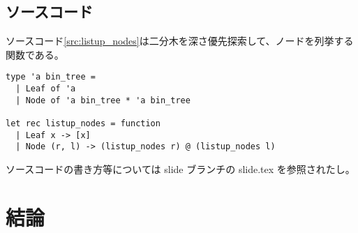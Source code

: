 \documentclass{sumiilab-paper}
\begin{document}
\section{ソースコード}

ソースコード\ref{src:listup_nodes}は二分木を深さ優先探索して、ノードを列挙する関数である。
\begin{lstlisting}[caption=二分木のノードのリストアップ,label=src:listup_nodes]
type 'a bin_tree =
  | Leaf of 'a
  | Node of 'a bin_tree * 'a bin_tree

let rec listup_nodes = function
  | Leaf x -> [x]
  | Node (r, l) -> (listup_nodes r) @ (listup_nodes l)
\end{lstlisting}
ソースコードの書き方等については slide ブランチの slide.tex を参照されたし。

\chapter{結論}



\end{document}

